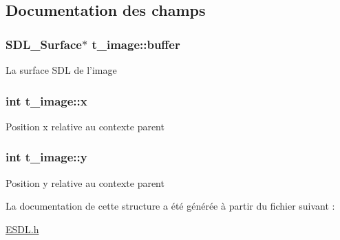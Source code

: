 \subsection{Documentation des champs}
\hypertarget{structt__image_a73c500129a82da9a5a076cfc62f7d542}{
\subsubsection[{buffer}]{\setlength{\rightskip}{0pt plus 5cm}S\+D\+L\+\_\+\+Surface$\ast$ t\+\_\+image\+::buffer}}\label{structt__image_a73c500129a82da9a5a076cfc62f7d542}
La surface S\+D\+L de l'image \hypertarget{structt__image_a6209266e69a1c07e69a0edad4b5ed99a}{
\subsubsection[{x}]{\setlength{\rightskip}{0pt plus 5cm}int t\+\_\+image\+::x}}\label{structt__image_a6209266e69a1c07e69a0edad4b5ed99a}
Position x relative au contexte parent \hypertarget{structt__image_a36899f0d81d2dd929228111bd258a762}{
\subsubsection[{y}]{\setlength{\rightskip}{0pt plus 5cm}int t\+\_\+image\+::y}}\label{structt__image_a36899f0d81d2dd929228111bd258a762}
Position y relative au contexte parent 

La documentation de cette structure a été générée à partir du fichier suivant \+:\begin{DoxyCompactItemize}
\item 
\hyperlink{_e_s_d_l_8h}{E\+S\+D\+L.\+h}\end{DoxyCompactItemize}
